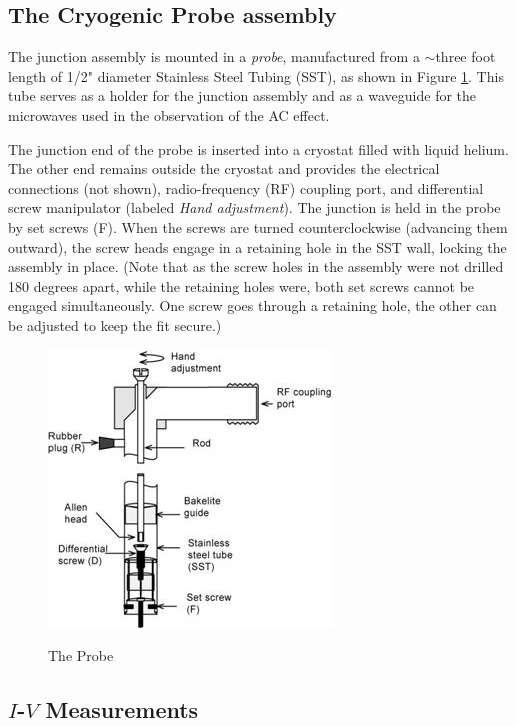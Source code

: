 \documentclass{../lab}
\begin{document}
\subsection{The Cryogenic Probe assembly}

The junction assembly is mounted in a \emph{probe}, manufactured from a $\sim$three foot length of 1/2" diameter Stainless Steel Tubing (SST), as shown in Figure \ref{fig:probe}. This tube serves as a holder for the junction assembly and as a waveguide for the microwaves used in the observation of the AC effect.

The junction end of the probe is inserted into a cryostat filled with liquid helium. The other end remains outside the cryostat and provides the electrical connections (not shown), radio-frequency (RF) coupling port, and differential screw manipulator (labeled \emph{Hand adjustment}). The junction is held in the probe by set screws (F). When the screws are turned counterclockwise (advancing them outward), the screw heads engage in a retaining hole in the SST wall, locking the assembly in place. (Note that as the screw holes in the assembly were not drilled 180 degrees apart, while the retaining holes were, both set screws cannot be engaged simultaneously. One screw goes through a retaining hole, the other can be adjusted to keep the fit secure.)

\begin{figure}[h]
    \centering
    \href{http://experimentationlab.berkeley.edu/sites/default/files/images/JOS6.jpg}{\includegraphics[width=0.5\linewidth]{images/JOS6.jpg}}
    \caption{The Probe}
    \label{fig:probe}
\end{figure}

\subsection{\texorpdfstring{$I$-$V$}{I-V} Measurements}
\end{document}
